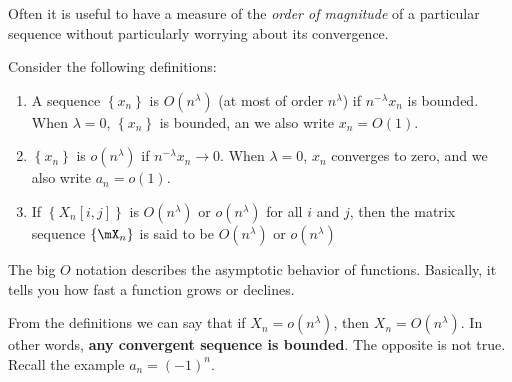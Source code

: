 \documentclass[english,12pt]{book}\usepackage[]{graphicx}\usepackage[]{xcolor}
\begin{document}
Often it is useful to have a measure of the \emph{order of magnitude} of a particular sequence without particularly worrying about its convergence. 
\begin{definition}\label{definition:big_little_oh}
Consider the following definitions:
	\begin{enumerate}
		\item A sequence $\left\lbrace x_n \right\rbrace $ is $O(n^{\lambda})$ (at most of order $n^{\lambda}$) if $n^{-\lambda}x_n$ is bounded. When $\lambda=0$, $\left\lbrace x_n \right\rbrace $ is bounded, an we also write $x_n=O(1)$.
		\item $\left\lbrace x_n \right\rbrace $ is $o(n^{\lambda})$ if $n^{-\lambda}x_n\to 0$. When $\lambda=0$, $x_n$ converges to zero, and we also write $a_n=o(1)$.
		\item If $\left\lbrace X_n\left[i,j\right]\right\rbrace$ is $O(n^\lambda)$ or $o(n^\lambda)$ for all $i$ and $j$, then the matrix sequence $\left\lbrace \mX_n\right\rbrace$ is said to be $O(n^\lambda)$ or $o(n^\lambda)$
	\end{enumerate}
\end{definition}

The big $O$ notation describes the asymptotic behavior of functions. Basically, it tells you how fast a function grows or declines. 

\begin{remark}
From the definitions we can say that if $X_n = o(n^\lambda)$, then $X_n = O(n^\lambda)$. In other words, \textbf{any convergent sequence is bounded}. The opposite is not true. Recall the example $a_n = (-1)^n$.
\end{remark}
\end{document}
